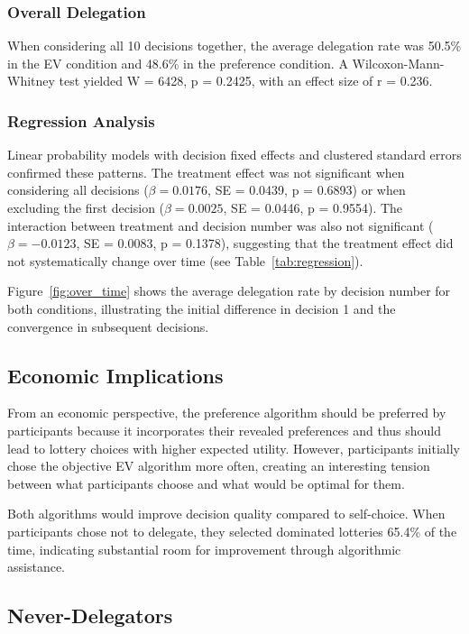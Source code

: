 \subsubsection{Overall Delegation}

When considering all 10 decisions together, the average delegation rate was 50.5\% in the EV condition and 48.6\% in the preference condition. A Wilcoxon-Mann-Whitney test yielded W = 6428, p = 0.2425, with an effect size of r = 0.236.

\subsubsection{Regression Analysis}

Linear probability models with decision fixed effects and clustered standard errors confirmed these patterns. The treatment effect was not significant when considering all decisions ($\beta = 0.0176$, SE = 0.0439, p = 0.6893) or when excluding the first decision ($\beta = 0.0025$, SE = 0.0446, p = 0.9554). The interaction between treatment and decision number was also not significant ($\beta = -0.0123$, SE = 0.0083, p = 0.1378), suggesting that the treatment effect did not systematically change over time (see Table~\ref{tab:regression}).

Figure~\ref{fig:over_time} shows the average delegation rate by decision number for both conditions, illustrating the initial difference in decision 1 and the convergence in subsequent decisions.

\subsection{Economic Implications}

From an economic perspective, the preference algorithm should be preferred by participants because it incorporates their revealed preferences and thus should lead to lottery choices with higher expected utility. However, participants initially chose the objective EV algorithm more often, creating an interesting tension between what participants choose and what would be optimal for them.

Both algorithms would improve decision quality compared to self-choice. When participants chose not to delegate, they selected dominated lotteries 65.4\% of the time, indicating substantial room for improvement through algorithmic assistance.

\subsection{Never-Delegators}

